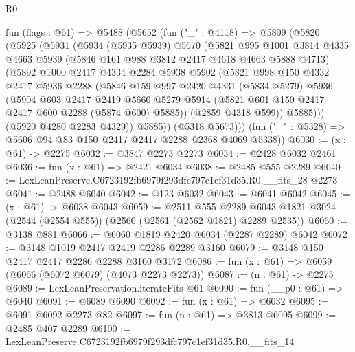 \begin{lexlean}{R0}
\begin{coremodule}
  fun (flags : @61) =>
  @5488
    (@5652
      (fun ("_" : @4118) =>
      @5809
        (@5820
          (@5925
            (@5931
              (@5934
                (@5935 @5939)
                @5670
                (@5821
                  @995
                  @1001
                  @3814
                  @4335
                  @4663
                  @5939
                  (@5846 @161 @988 @3812 @2417 @4618 @4663 @5888 @4713)
                  (@5892
                    @1000
                    @2417
                    @4334
                    @2284
                    @5938
                    @5902
                    (@5821
                      @998
                      @150
                      @4332
                      @2417
                      @5936
                      @2288
                      (@5846
                        @159
                        @997
                        @2420
                        @4331
                        (@5834 @5279)
                        @5936
                        (@5904
                          @603
                          @2417
                          @2419
                          @5660
                          @5279
                          @5914
                          (@5821 @601 @150 @2417 @2417 @600 @2288 (@5874 @600) @5885))
                        (@2859 @4318 @599))
                      @5885)))
                (@5920 @4280 @2283 @4329))
              @5885))
          (@5318 @5673)))
      (fun ("_" : @5328) => @5606 @94 @83 @150 @2417 @2417 @2288 @2368 @4069 @5338))
@6030 := (x : @61) -> @2275
@6032 := @3847 @2273 @2273
@6034 := @2428 @6032 @2461
@6036 := fun (x : @61) => @2421 @6034
@6038 := @2485 @555 @2289
@6040 := LexLeanPreserve.C6723192fb6979f293dfc797c1ef31d35.R0.__fits_28 @2273
@6041 := @2488 @6040
@6042 := @123 @6032
@6043 := @6041 @6042
@6045 := (x : @61) -> @6038 @6043
@6059 := @2511
    @555
    @2289
    @6043
    @1821
    @3024
    (@2544 (@2554 @555))
    (@2560 (@2561 (@2562 @1821) @2289 @2535))
@6060 := @3138 @881
@6066 := @6060 @1819 @2420 @6034 (@2287 @2289) @6042
@6072 := @3148 @1019 @2417 @2419 @2286 @2289 @3160
@6079 := @3148 @150 @2417 @2417 @2286 @2288 @3160 @3172
@6086 := fun (x : @61) => @6059 (@6066 (@6072 @6079) (@4073 @2273 @2273))
@6087 := (n : @61) -> @2275
@6089 := LexLeanPreservation.iterateFits @61
@6090 := fun (__p0 : @61) => @6040
@6091 := @6089 @6090
@6092 := fun (x : @61) => @6032
@6095 := @6091 @6092 @2273 @82
@6097 := fun (n : @61) => @3813 @6095
@6099 := @2485 @407 @2289
@6100 := LexLeanPreserve.C6723192fb6979f293dfc797c1ef31d35.R0.__fits_14

\end{coremodule}
\end{lexlean}
